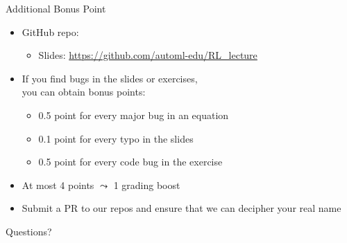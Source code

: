 \documentclass[aspectratio=169]{../latex_main/tntbeamer}  %
\begin{document}
\begin{frame}[c]{Additional Bonus Point}

\begin{itemize}
    \item GitHub repo:
    \begin{itemize}
        \item Slides: \url{https://github.com/automl-edu/RL_lecture}
    \end{itemize}
    \item If you find bugs in the slides or exercises,\\ you can obtain bonus points:
    \begin{itemize}
        \item 0.5 point for every major bug in an equation
        \item 0.1 point for every typo in the slides
        \item 0.5 point for every code bug in the exercise
    \end{itemize}
    \item At most 4 points $\leadsto$ 1 grading boost
    \item Submit a PR to our repos and ensure that we can decipher your real name
\end{itemize}


\end{frame}
\begin{frame}[c]{}
	
	\centering
	\huge
	Questions?
	
\end{frame}


\end{document}
